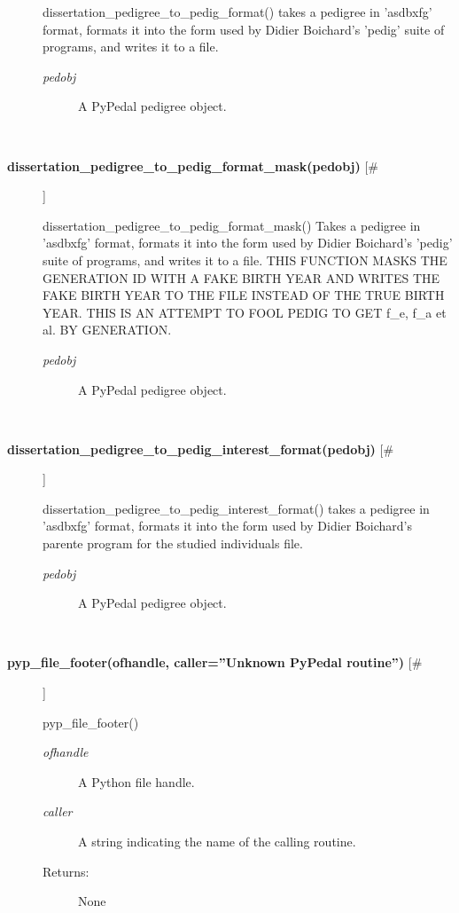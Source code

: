\begin{description}
 dissertation\_pedigree\_to\_pedig\_format() takes a pedigree in 'asdbxfg' format, formats it into the form used by Didier Boichard's 'pedig' suite of programs, and writes it to a file.
\begin{description}
\item[\emph{pedobj}
] A PyPedal pedigree object.

\end{description}
\\ 

\item[\textbf{dissertation\_pedigree\_to\_pedig\_format\_mask(pedobj)}
 [\#]]

 dissertation\_pedigree\_to\_pedig\_format\_mask() Takes a pedigree in 'asdbxfg' format, formats it into the form used by Didier Boichard's 'pedig' suite of programs, and writes it to a file. THIS FUNCTION MASKS THE GENERATION ID WITH A FAKE BIRTH YEAR AND WRITES THE FAKE BIRTH YEAR TO THE FILE INSTEAD OF THE TRUE BIRTH YEAR. THIS IS AN ATTEMPT TO FOOL PEDIG TO GET f\_e, f\_a et al. BY GENERATION.
\begin{description}
\item[\emph{pedobj}
] A PyPedal pedigree object.

\end{description}
\\ 

\item[\textbf{dissertation\_pedigree\_to\_pedig\_interest\_format(pedobj)}
 [\#]]

 dissertation\_pedigree\_to\_pedig\_interest\_format() takes a pedigree in 'asdbxfg' format, formats it into the form used by Didier Boichard's parente program for the studied individuals file.
\begin{description}
\item[\emph{pedobj}
] A PyPedal pedigree object.

\end{description}
\\ 

\item[\textbf{pyp\_file\_footer(ofhandle, caller=''Unknown PyPedal routine'')}
 [\#]]

 pyp\_file\_footer()
\begin{description}
\item[\emph{ofhandle}
] A Python file handle.
\item[\emph{caller}
] A string indicating the name of the calling routine.
\item[Returns:] None


\end{description}
\end{description}

